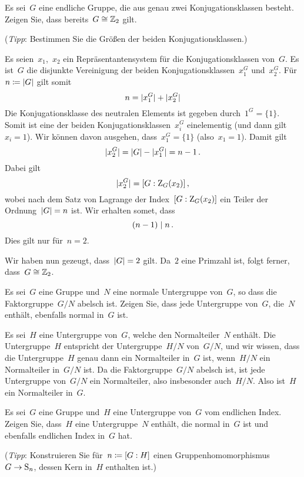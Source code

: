 \documentclass{scrartcl}
\begin{document}
\begin{exercise}
  Es sei~$G$ eine endliche Gruppe, die aus genau zwei Konjugationsklassen besteht.
  Zeigen Sie, dass bereits~$G \cong \mathbb{Z}_2$ gilt.

  (\emph{Tipp}: Bestimmen Sie die Größen der beiden Konjugationsklassen.)
\end{exercise}

\begin{solution}
  Es seien~$x_1$,~$x_2$ ein Repräsentantensystem für die Konjugationsklassen von~$G$.
  Es ist~$G$ die disjunkte Vereinigung der beiden Konjugationsklassen~$x_1^G$ und~$x_2^G$.
  Für~$n \coloneqq \lvert G\rvert$ gilt somit
  \[
    n
    =
    \lvert x_1^G\rvert + \lvert x_2^G\rvert
  \]
  Die Konjugationsklasse des neutralen Elements ist gegeben durch~$1^G = \{ 1 \}$.
  Somit ist eine der beiden Konjugationsklassen~$x_i^G$ einelementig (und dann gilt~$x_i = 1$).
  Wir können davon ausgehen, dass~$x_1^G = \{ 1 \}$ (also~$x_1 = 1$).
  Damit gilt
  \[
    \lvert x_2^G \rvert
    =
    \lvert G\rvert - \lvert x_1^G \rvert
    =
    n - 1 \,.
  \]
  Dabei gilt
  \[
    \lvert x_2^G \rvert
    =
    [G : \operatorname{Z}_G(x_2)] \,,
  \]
  wobei nach dem Satz von Lagrange der Index~$[G : \operatorname{Z}_G(x_2)]$ ein Teiler der Ordnung~$\lvert G\rvert = n$ ist.
  Wir erhalten somet, dass
  \[
    (n-1) \mid n \,.
  \]
  Dies gilt nur für~$n = 2$.

  Wir haben nun gezeugt, dass~$\lvert G\rvert = 2$ gilt.
  Da~$2$ eine Primzahl ist, folgt ferner, dass~$G \cong \mathbb{Z}_2$.
\end{solution}

\begin{exercise}
  Es sei~$G$ eine Gruppe und~$N$ eine normale Untergruppe von~$G$, so dass die Faktorgruppe~$G/N$ abelsch ist.
  Zeigen Sie, dass jede Untergruppe von~$G$, die~$N$ enthält, ebenfalls normal in~$G$ ist.
\end{exercise}

\begin{solution}
  Es sei~$H$ eine Untergruppe von~$G$, welche den Normalteiler~$N$ enthält.
  Die Untergruppe~$H$ entspricht der Untergruppe~$H/N$ von~$G/N$, und wir wissen, dass die Untergruppe~$H$ genau dann ein Normalteiler in~$G$ ist, wenn~$H/N$ ein Normalteiler in~$G/N$ ist.
  Da die Faktorgruppe~$G/N$ abelsch ist, ist jede Untergruppe von~$G/N$ ein Normalteiler, also insbesonder auch~$H/N$.
  Also ist~$H$ ein Normalteiler in~$G$.
\end{solution}

\begin{exercise}
  Es sei~$G$ eine Gruppe und~$H$ eine Untergruppe von~$G$ vom endlichen Index.
  Zeigen Sie, dass~$H$ eine Untergruppe~$N$ enthält, die normal in~$G$ ist und ebenfalls endlichen Index in~$G$ hat.

  (\emph{Tipp}: Konstruieren Sie für~$n \coloneqq [G : H]$ einen Gruppenhomomorphismus~$G \to \Sym_n$, dessen Kern in~$H$ enthalten ist.)
\end{exercise}
\end{document}
